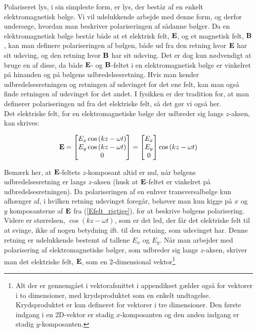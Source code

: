 Polariseret lys, i sin simpleste form, er lys, der består af en enkelt elektromagnetisk bølge. Vi vil udelukkende arbejde med denne form, og derfor undersøge, hvordan man beskriver polariseringen af sådanne bølger. Da en elektromagnetisk bølge består både at et elektrisk felt, $\mathbf{E}$, og et magnetisk felt, $\mathbf{B}$, kan man definere polariseringen af bølgen, både ud fra den retning hvor $\mathbf{E}$ har sit udsving, og den retning hvor $\mathbf{B}$ har sit udsving. Det er dog kun nødvendigt at bruge en af disse, da både $\mathbf{E}$- og $\mathbf{B}$-feltet i en elektromagnetisk bølge er vinkelret på hinanden og på bølgens udbredelsesretning. Hvis man kender udbredelsesretningen og retningen af udsvinget for det ene felt, kan man også finde retningen af udsvinget for det andet. I fysikken er der tradition for, at man definerer polariseringen ud fra det elektriske felt, så det gør vi også her.\\

Det elektriske felt, for en elektromagnetiske bølge der udbreder sig langs $z$-aksen, kan skrives:

\begin{equation}
\mathbf{E} = \begin{bmatrix} E_x \cos \left( kz - \omega t \right) \\ E_y \cos \left( kz - \omega t \right) \\ 0 \end{bmatrix} = \begin{bmatrix} E_x \\ E_y \\ 0 \end{bmatrix} \cos \left( kz - \omega t \right)
\label{Efelt_rigtige}
\end{equation}

\vspace{2mm}

Bemærk her, at $\mathbf{E}$-feltets $z$-komposant altid er nul, når bølgens udbredelsesretning er langs $z$-aksen (husk at $\mathbf{E}$-feltet er vinkelret på udbredelsesretningen). Da polariseringen af en enhver transversalbølge kun afhænger af, i hvilken retning udsvinget foregår, behøver man kun kigge på $x$ og $y$ komposanterne af $\mathbf{E}$ fra (\ref{Efelt_rigtige}), for at beskrive bølgens polarisering. Videre er størrelsen, $\cos \left( kz - \omega t \right)$, som er det led, der får det elektriske felt til at svinge, ikke af nogen betydning ift. til den retning, som udsvinget har. Denne retning er udelukkende bestemt af tallene $E_x$ og $E_y$. Når man arbejder med polarisering af elektromagnetiske bølger, som udbreder sig langs $z$-aksen, skriver man det elektriske felt, $\mathbf{E}$, som en 2-dimensional vektor\footnote{Alt der er gennemgået i vektorafsnittet i appendikset gælder også for vektorer i to dimensioner, med krydsproduktet som en enkelt undtagelse. Krydsproduktet er kun defineret for vektorer i tre dimensioner. Den første indgang i en 2D-vektor er stadig $x$-komposanten og den anden indgang er stadig $y$-komposanten.}

